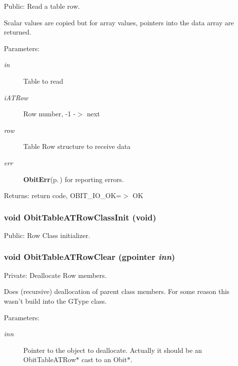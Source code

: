 Public: Read a table row. 

Scalar values are copied but for array values, pointers into the data array are returned. \begin{Desc}
\item[Parameters:]
\begin{description}
\item[{\em in}]Table to read \item[{\em i\-ATRow}]Row number, -1 -$>$ next \item[{\em row}]Table Row structure to receive data \item[{\em err}]{\bf Obit\-Err}{\rm (p.\,\pageref{structObitErr})} for reporting errors. \end{description}
\end{Desc}
\begin{Desc}
\item[Returns:]return code, OBIT\_\-IO\_\-OK=$>$ OK \end{Desc}
\subsubsection{\setlength{\rightskip}{0pt plus 5cm}void Obit\-Table\-ATRow\-Class\-Init (void)}\label{ObitTableAT_8c_a26}


Public: Row Class initializer. 

\subsubsection{\setlength{\rightskip}{0pt plus 5cm}void Obit\-Table\-ATRow\-Clear (gpointer {\em inn})}\label{ObitTableAT_8c_a7}


Private: Deallocate Row members. 

Does (recursive) deallocation of parent class members. For some reason this wasn't build into the GType class. \begin{Desc}
\item[Parameters:]
\begin{description}
\item[{\em inn}]Pointer to the object to deallocate. Actually it should be an Obit\-Table\-ATRow$\ast$ cast to an Obit$\ast$. \end{description}
\end{Desc}
